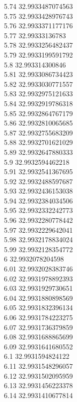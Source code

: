{5.74	32.9933487074563\\
5.75	32.9933428976743\\
5.76	32.9933371177176\\
5.77	32.99333136783\\
5.78	32.9933256482437\\
5.79	32.9933199591792\\
5.8	32.993314300846\\
5.81	32.9933086734423\\
5.82	32.9933030771557\\
5.83	32.9932975121633\\
5.84	32.9932919786318\\
5.85	32.9932864767179\\
5.86	32.9932810065685\\
5.87	32.9932755683209\\
5.88	32.9932701621029\\
5.89	32.9932647880333\\
5.9	32.9932594462218\\
5.91	32.9932541367695\\
5.92	32.9932488597687\\
5.93	32.9932436153038\\
5.94	32.9932384034506\\
5.95	32.9932332242773\\
5.96	32.9932280778442\\
5.97	32.9932229642041\\
5.98	32.9932178834024\\
5.99	32.9932128354772\\
6	32.9932078204598\\
6.01	32.9932028383746\\
6.02	32.9931978892393\\
6.03	32.9931929730651\\
6.04	32.9931880898569\\
6.05	32.9931832396134\\
6.06	32.9931784223275\\
6.07	32.9931736379859\\
6.08	32.9931688865699\\
6.09	32.9931641680552\\
6.1	32.9931594824122\\
6.11	32.9931548296057\\
6.12	32.9931502095959\\
6.13	32.9931456223378\\
6.14	32.9931410677814\\
}
